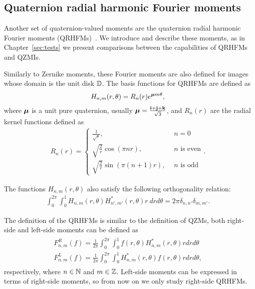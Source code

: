 \subsection{Quaternion radial harmonic Fourier moments}
Another set of quaternion-valued moments are the quaternion radial harmonic Fourier moments (QRHFMs)~\cite{Wang, WangAcc, LiuAcc}. We introduce and describe these moments, as in Chapter~\ref{sec:tests} we present comparisons between the capabilities of QRHFMs and QZMIs.


Similarly to Zernike moments, these Fourier moments are also defined for images whose domain is the unit disk $\mathbb{D}$. The basis functions for QRHFMs are defined as
\begin{gather*}
    H_{n,m}(r,\theta) = R_n(r)e^{\boldsymbol{\mu} m \theta},
\end{gather*}
where $\boldsymbol{\mu}$ is a unit pure quaternion, usually $\boldsymbol{\mu} = \frac{\mathbf{i} + \mathbf{j} + \mathbf{k}}{\sqrt{3}}$, and $R_n(r)$ are the radial kernel functions defined as
\begin{gather*}
    R_n(r) = \begin{cases}
        \frac{1}{\sqrt{r}}, &n = 0\\
        \sqrt{\frac{2}{r}}\cos(\pi n r), &n \text{ is even}\\
        \sqrt{\frac{2}{r}}\sin(\pi (n+1) r), \ \ &n \text{ is odd}
    \end{cases}.
\end{gather*}

The functions $H_{n,m}(r,\theta)$ also satisfy the following orthogonality relation:
\begin{gather*}
     \int_0^{2\pi} \int_0^1 H_{n,m}(r,\theta) H^*_{n',m'}(r,\theta) r \ dr d \theta = 2\pi\delta_{n,n'}\delta_{m,m'}.
\end{gather*}


The definition of the QRHFMs is similar to the definition of QZMs, both right-side and left-side moments can be defined as
\begin{gather} \label{eq:QRHFM}
    \begin{split}F_{n,m}^R(f) = \frac{1}{2\pi}\int_0^{2\pi} \int_0^1 f(r,\theta)H_{n,m}^*(r,\theta) r dr d \theta \\
    F_{n,m}^L(f) = \frac{1}{2\pi}\int_0^{2\pi} \int_0^1 H_{n,m}^*(r,\theta)f(r,\theta) r dr d \theta,
    \end{split}
\end{gather} respectively, where $n \in \mathbb{N}$ and $m \in \mathbb{Z}$. Left-side moments can be expressed in terms of right-side moments, so from now on we only study right-side QRHFMs.


